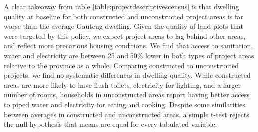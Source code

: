 \documentclass[12pt]{article}
\begin{document}
A clear takeaway from table \ref{table:projectdescriptivescensus} is that dwelling quality at baseline for both constructed and unconstructed project areas is far worse than the average Gauteng dwel\-ling. Given the quality of land plots that were targeted by this policy, we expect project areas to lag behind other areas, and reflect more precarious housing conditions. We find that access to sanitation, water and electricity are between 25 and 50\% lower in both types of project areas relative to the province as a whole. Comparing constructed to unconstructed projects, we find no systematic differences in dwelling quality. While constructed areas are more likely to have flush toilets, electricity for lighting, and a larger number of rooms, households in unconstructed areas report having better access to piped water and electricity for eating and cooking. Despite some similarities between averages in constructed and unconstructed areas, a simple t-test rejects the null hypothesis that means are equal for every tabulated variable.
\end{document}
